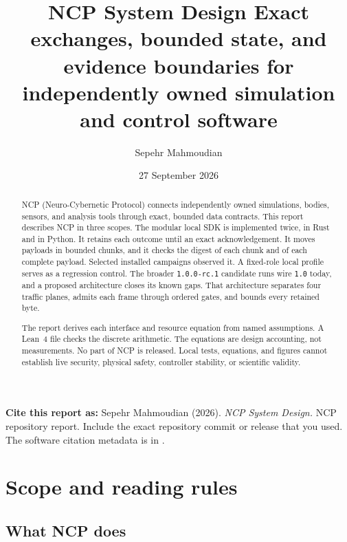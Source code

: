 \documentclass[11pt,a4paper]{article}
\title{\NcpReportTitle
  {NCP System Design}
  {Exact exchanges, bounded state, and evidence boundaries for independently
   owned simulation and control software}}
\author{Sepehr Mahmoudian}
\date{27 September 2026}
\theoremstyle{definition}
\let\NcpTextttBase\texttt
\renewcommand{\texttt}[1]{\mbox{\NcpTextttBase{#1}}}
\begin{document}

\textbf{Cite this report as:} Sepehr Mahmoudian (2026). \emph{NCP System Design.} NCP
repository report. Include the exact repository commit or release that you used. The
software citation metadata is in .

\begin{abstract}
\noindent NCP (Neuro-Cybernetic Protocol) connects independently owned simulations,
bodies, sensors, and analysis tools through exact, bounded data contracts. This report
describes NCP in three scopes. The modular local SDK is implemented twice, in Rust and
in Python. It retains each outcome until an exact acknowledgement. It moves payloads in bounded
chunks, and it checks the digest of each chunk and of each complete payload. Selected installed campaigns observed it. A fixed-role local
profile serves as a regression control. The broader \texttt{1.0.0-rc.1} candidate runs
wire \texttt{1.0} today, and a proposed architecture closes its known gaps. That
architecture separates four traffic planes, admits each frame through ordered gates,
and bounds every retained byte.

The report derives each interface and resource equation from named assumptions. A
Lean~4 file checks the discrete arithmetic. The equations are design accounting, not
measurements. No part of NCP is released. Local tests, equations, and figures cannot
establish live security, physical safety, controller stability, or scientific validity.
\end{abstract}


\clearpage
\NcpTableOfContents

\section{Scope and reading rules}

\subsection{What NCP does}
\end{document}
